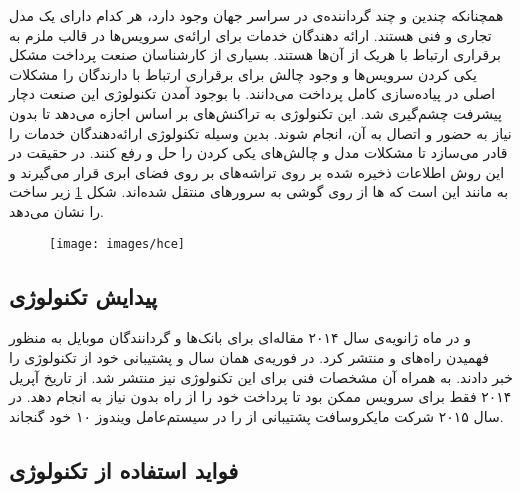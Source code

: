 \documentclass[oneside]{report}
\begin{document}
همچنانکه چندین و چند گرداننده‌ی 
{\normalsize {}}
در سراسر جهان وجود دارد، هر کدام دارای یک مدل تجاری و فنی هستند. ارائه دهندگان خدمات برای ارائه‌ی سرویس‌ها در قالب
{\normalsize {}}
ملزم به برقراری ارتباط با هریک از آن‌ها هستند. بسیاری از کارشناسان صنعت پرداخت مشکل یکی کردن سرویس‌ها و وجود چالش برای برقراری ارتباط با دارندگان
{\normalsize {}} را
مشکلات اصلی در پیاده‌سازی کامل پرداخت 
{\normalsize {}}
می‌دانند. با بوجود آمدن تکنولوژی 
{\normalsize {}}
این صنعت دچار پیشرفت چشم‌گیری شد. این تکنولوژی به تراکنش‌های بر اساس 
{\normalsize {}}
اجازه می‌دهد تا بدون نیاز به حضور 
{\normalsize {}}
و اتصال به آن، انجام شوند. بدین وسیله تکنولوژی 
{\normalsize {}}
ارائه‌دهندگان خدمات را قادر می‌سازد تا مشکلات مدل 
{\normalsize {}}
و چالش‌های یکی کردن 
را حل و رفع کنند.
در حقیقت در این روش اطلاعات ذخیره شده بر روی تراشه‌های 
{\normalsize {}}
بر روی فضای ابری قرار می‌گیرند و به مانند این است که 
{\normalsize {}}
ها از روی گوشی به سرورهای 
{\normalsize {}}
منتقل شده‌اند. شکل 
\ref{fig:hce}
زیر ساخت 
{\normalsize  {}}
را نشان می‌دهد.

\begin{figure}[h]
	\centering
	\texttt{[image: images/hce]}
	\caption{{\footnotesize {}}}
	\label{fig:hce}
\end{figure}

\subsection{پیدایش تکنولوژی {\normalsize{}}} 
{\normalsize {}}
و 
{\normalsize {}}
در ماه ژانویه‌ی سال ۲۰۱۴ مقاله‌ای برای بانک‌ها و گردانندگان موبایل به منظور فهمیدن راه‌های
{\normalsize {}}
و 
{\normalsize {}}
منتشر کرد. در فوریه‌ی همان سال 
{\normalsize {}}
و 
{\normalsize {}}
پشتیبانی خود از تکنولوژی 
{\normalsize {}}
را خبر دادند. به همراه آن مشخصات فنی برای این تکنولوژی نیز منتشر شد.  از تاریخ آپریل ۲۰۱۴ فقط برای 
سرویس 
{\normalsize {}}
ممکن بود تا پرداخت 
{\normalsize {}}
خود را از راه 
{\normalsize {}}
بدون نیاز به 
{\normalsize {}}  
انجام دهد. در سال ۲۰۱۵ شرکت مایکروسافت پشتیبانی از 
{\normalsize {}}
را در سیستم‌عامل ویندوز ۱۰ خود گنجاند. 

\subsection{فواید استفاده از تکنولوژی {\normalsize {}}}
\end{document}
